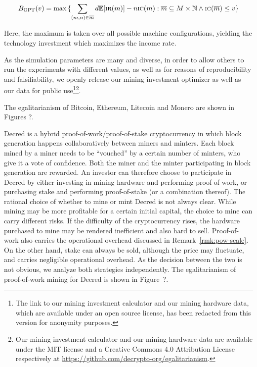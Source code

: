 \[
  B_\textsc{OPT}(v)
  =
  \max{
    \{
      \sum_{(m, n) \in \overline{m}}
      {d\mathbb{E}[\textsc{ir}(m)] - n\textsc{ic}(m)}:
      \overline{m} \subseteq M \times \mathbb{N}
      \land
      \textsc{ic}(\overline{m}) \leq v
    \}
  }
\]

Here, the maximum is taken over all possible machine configurations, yielding
the technology investment which maximizes the income rate.

As the simulation parameters are many and diverse, in order to allow others to
run the experiments with different values, as well as for reasons of
reproducibility and falsifiability, we openly release our mining investment
optimizer as well as our data for public use\ifanonymous\footnote{
  The link to our mining investment calculator and our mining hardware data,
  which are available under an open source license, has been redacted from this
  version for anonymity purposes.
}\else\footnote{
  Our mining investment calculator and our mining hardware data are available
  under the MIT license and a Creative Commons 4.0 Attribution License
  respectively at \url{https://github.com/decrypto-org/egalitarianism}.
}\fi.

The egalitarianism of Bitcoin, Ethereum, Litecoin and Monero are shown in
Figures ?.

Decred is a hybrid proof-of-work/proof-of-stake cryptocurrency in which block
generation happens collaboratively between miners and minters. Each block mined
by a miner needs to be ``vouched'' by a certain number of minters, who give it a
vote of confidence. Both the miner and the minter participating in block
generation are rewarded. An investor can therefore choose to participate in
Decred by either investing in mining hardware and performing proof-of-work, or
purchasing stake and performing proof-of-stake (or a combination thereof). The
rational choice of whether to mine or mint Decred is not always clear. While
mining may be more profitable for a certain initial capital, the choice to mine
can carry different risks. If the difficulty of the cryptocurrency rises, the
hardware purchased to mine may be rendered inefficient and also hard to sell.
Proof-of-work also carries the operational overhead discussed in
Remark~\ref{rmk:pow-scale}. On the other hand, stake can always be sold,
although the price may fluctuate, and carries negligible operational overhead.
As the decision between the two is not obvious, we analyze both strategies
independently. The egalitarianism of proof-of-work mining for Decred is shown in
Figure~?.

